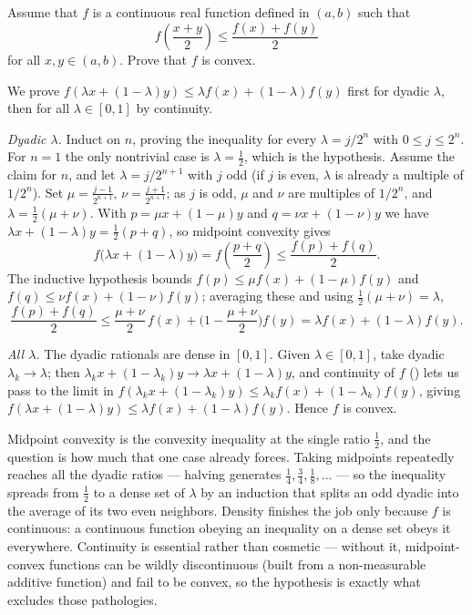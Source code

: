 \documentclass[main.tex]{subfiles}
\begin{document}
Assume that $f$ is a continuous real function defined in $(a, b)$ such that
\[
f\!\left(\frac{x + y}{2}\right) \leq \frac{f(x) + f(y)}{2}
\]
for all $x, y \in (a, b)$. Prove that $f$ is convex.
\begin{SolutionBlue}
We prove $f(\lambda x + (1 - \lambda) y) \le \lambda f(x) + (1 - \lambda) f(y)$ first for dyadic $\lambda$, then for all $\lambda \in [0, 1]$ by continuity.

\emph{Dyadic $\lambda$.} Induct on $n$, proving the inequality for every $\lambda = j/2^{n}$ with $0 \le j \le 2^{n}$. For $n = 1$ the only nontrivial case is $\lambda = \tfrac{1}{2}$, which is the hypothesis. Assume the claim for $n$, and let $\lambda = j/2^{n+1}$ with $j$ odd (if $j$ is even, $\lambda$ is already a multiple of $1/2^{n}$). Set $\mu = \frac{j-1}{2^{n+1}}$, $\nu = \frac{j+1}{2^{n+1}}$; as $j$ is odd, $\mu$ and $\nu$ are multiples of $1/2^{n}$, and $\lambda = \tfrac{1}{2}(\mu + \nu)$. With $p = \mu x + (1 - \mu) y$ and $q = \nu x + (1 - \nu) y$ we have $\lambda x + (1 - \lambda) y = \tfrac{1}{2}(p + q)$, so midpoint convexity gives
\[
f\big(\lambda x + (1 - \lambda) y\big) = f\!\left(\frac{p + q}{2}\right) \le \frac{f(p) + f(q)}{2}.
\]
The inductive hypothesis bounds $f(p) \le \mu f(x) + (1 - \mu) f(y)$ and $f(q) \le \nu f(x) + (1 - \nu) f(y)$; averaging these and using $\tfrac{1}{2}(\mu + \nu) = \lambda$,
\[
\frac{f(p) + f(q)}{2} \le \frac{\mu + \nu}{2}\, f(x) + \Big(1 - \frac{\mu + \nu}{2}\Big) f(y) = \lambda f(x) + (1 - \lambda) f(y).
\]

\emph{All $\lambda$.} The dyadic rationals are dense in $[0, 1]$. Given $\lambda \in [0, 1]$, take dyadic $\lambda_{k} \to \lambda$; then $\lambda_{k} x + (1 - \lambda_{k}) y \to \lambda x + (1 - \lambda) y$, and continuity of $f$ () lets us pass to the limit in $f(\lambda_{k} x + (1 - \lambda_{k}) y) \le \lambda_{k} f(x) + (1 - \lambda_{k}) f(y)$, giving $f(\lambda x + (1 - \lambda) y) \le \lambda f(x) + (1 - \lambda) f(y)$. Hence $f$ is convex.
\end{SolutionBlue}
\begin{Reflection}
Midpoint convexity is the convexity inequality at the single ratio $\tfrac{1}{2}$, and the question is how much that one case already forces. Taking midpoints repeatedly reaches all the dyadic ratios --- halving generates $\tfrac{1}{4}, \tfrac{3}{4}, \tfrac{1}{8}, \dots$ --- so the inequality spreads from $\tfrac{1}{2}$ to a dense set of $\lambda$ by an induction that splits an odd dyadic into the average of its two even neighbors. Density finishes the job only because $f$ is continuous: a continuous function obeying an inequality on a dense set obeys it everywhere. Continuity is essential rather than cosmetic --- without it, midpoint-convex functions can be wildly discontinuous (built from a non-measurable additive function) and fail to be convex, so the hypothesis is exactly what excludes those pathologies.
\end{Reflection}
\end{document}
